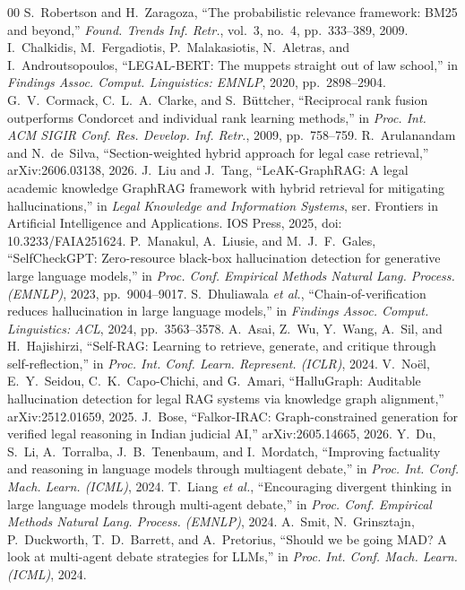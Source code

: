 \documentclass[conference]{IEEEtran}
\begin{document}
\begin{thebibliography}{00}
 S.~Robertson and H.~Zaragoza, ``The probabilistic relevance framework: BM25 and beyond,'' \emph{Found. Trends Inf. Retr.}, vol.~3, no.~4, pp.~333--389, 2009.
 I.~Chalkidis, M.~Fergadiotis, P.~Malakasiotis, N.~Aletras, and I.~Androutsopoulos, ``LEGAL-BERT: The muppets straight out of law school,'' in \emph{Findings Assoc. Comput. Linguistics: EMNLP}, 2020, pp.~2898--2904.
 G.~V.~Cormack, C.~L.~A.~Clarke, and S.~B\"uttcher, ``Reciprocal rank fusion outperforms Condorcet and individual rank learning methods,'' in \emph{Proc. Int. ACM SIGIR Conf. Res. Develop. Inf. Retr.}, 2009, pp.~758--759.
 R.~Arulanandam and N.~de~Silva, ``Section-weighted hybrid approach for legal case retrieval,'' arXiv:2606.03138, 2026.
 J.~Liu and J.~Tang, ``LeAK-GraphRAG: A legal academic knowledge GraphRAG framework with hybrid retrieval for mitigating hallucinations,'' in \emph{Legal Knowledge and Information Systems}, ser. Frontiers in Artificial Intelligence and Applications. IOS Press, 2025, doi: 10.3233/FAIA251624.
 P.~Manakul, A.~Liusie, and M.~J.~F.~Gales, ``SelfCheckGPT: Zero-resource black-box hallucination detection for generative large language models,'' in \emph{Proc. Conf. Empirical Methods Natural Lang. Process. (EMNLP)}, 2023, pp.~9004--9017.
 S.~Dhuliawala \emph{et al.}, ``Chain-of-verification reduces hallucination in large language models,'' in \emph{Findings Assoc. Comput. Linguistics: ACL}, 2024, pp.~3563--3578.
 A.~Asai, Z.~Wu, Y.~Wang, A.~Sil, and H.~Hajishirzi, ``Self-RAG: Learning to retrieve, generate, and critique through self-reflection,'' in \emph{Proc. Int. Conf. Learn. Represent. (ICLR)}, 2024.
 V.~No\"el, E.~Y.~Seidou, C.~K.~Capo-Chichi, and G.~Amari, ``HalluGraph: Auditable hallucination detection for legal RAG systems via knowledge graph alignment,'' arXiv:2512.01659, 2025.
 J.~Bose, ``Falkor-IRAC: Graph-constrained generation for verified legal reasoning in Indian judicial AI,'' arXiv:2605.14665, 2026.
 Y.~Du, S.~Li, A.~Torralba, J.~B.~Tenenbaum, and I.~Mordatch, ``Improving factuality and reasoning in language models through multiagent debate,'' in \emph{Proc. Int. Conf. Mach. Learn. (ICML)}, 2024.
 T.~Liang \emph{et al.}, ``Encouraging divergent thinking in large language models through multi-agent debate,'' in \emph{Proc. Conf. Empirical Methods Natural Lang. Process. (EMNLP)}, 2024.
 A.~Smit, N.~Grinsztajn, P.~Duckworth, T.~D.~Barrett, and A.~Pretorius, ``Should we be going MAD? A look at multi-agent debate strategies for LLMs,'' in \emph{Proc. Int. Conf. Mach. Learn. (ICML)}, 2024.

\end{thebibliography}
\end{document}
